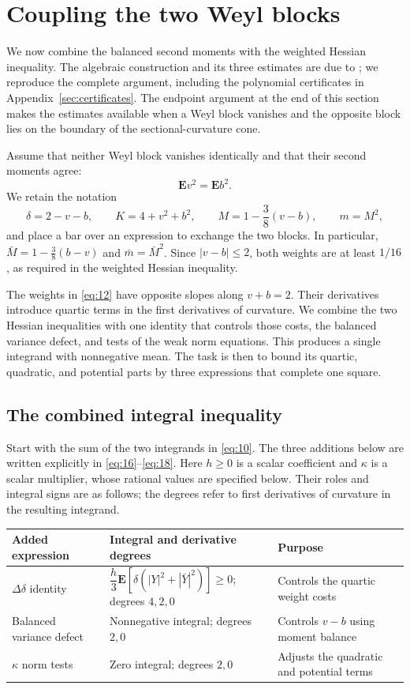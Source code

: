 \section{Coupling the two Weyl blocks}\label{sec:coupling}

We now combine the balanced second moments with the weighted Hessian
inequality. The algebraic construction and its three estimates are due
to \cite[Proposition~6.1 and Section~7]{OpenAI2026P}; we reproduce the
complete argument, including the polynomial certificates in
Appendix~\ref{sec:certificates}. The endpoint argument at the end of this
section makes the estimates available when a Weyl block vanishes and the
opposite block lies on the boundary of the sectional-curvature cone.

Assume that neither Weyl block vanishes identically and that their second
moments agree:
\[
 \mathbf E v^2=\mathbf E b^2.
\]
We retain the notation
\[
 \delta=2-v-b,\qquad K=4+v^2+b^2,\qquad
 M=1-\frac38(v-b),\qquad m=M^2,
\]
and place a bar over an expression to exchange the two blocks. In
particular, $\bar M=1-\frac38(b-v)$ and $\bar m=\bar M^2$.
Since $|v-b|\le2$, both weights are at least $1/16$, as required in
the weighted Hessian inequality.

The weights in \eqref{eq:12} have opposite slopes along $v+b=2$.
Their derivatives introduce quartic terms in the first derivatives of
curvature. We combine the two Hessian inequalities with one identity that
controls those costs, the balanced variance defect, and tests of the weak
norm equations. This produces a single integrand with nonnegative mean.
The task is then to bound its quartic, quadratic, and potential parts by
three expressions that complete one square.

\subsection{The combined integral inequality}

Start with the sum of the two integrands in \eqref{eq:10}. The three
additions below are written explicitly in \eqref{eq:16}--\eqref{eq:18}.
Here $h\ge0$ is a scalar coefficient and $\kappa$ is a scalar multiplier,
whose rational values are specified below. Their roles and integral signs
are as follows; the degrees refer to first
derivatives of curvature in the resulting integrand.
\begin{center}
\small
\begin{tabular}{@{}p{}p{}p{}@{}}
\toprule
Added expression & Integral and derivative degrees & Purpose\\
\midrule
$\Delta\delta$ identity &
$\dfrac h3\mathbf E[\delta(|Y|^2+|\bar Y|^2)]\ge0$; degrees $4,2,0$ &
Controls the quartic weight costs\\
Balanced variance defect & Nonnegative integral; degrees $2,0$ &
Controls $v-b$ using moment balance\\
$\kappa$ norm tests & Zero integral; degrees $2,0$ &
Adjusts the quadratic and potential terms\\
\bottomrule
\end{tabular}
\end{center}

